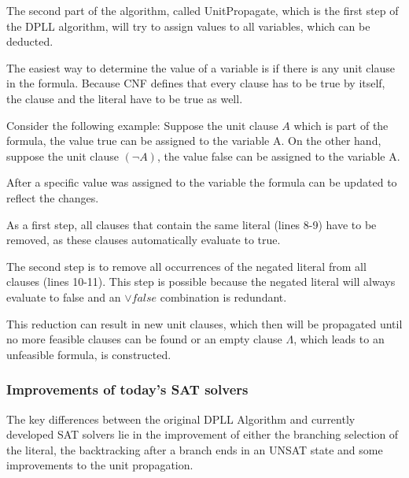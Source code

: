 The second part of the algorithm, called UnitPropagate, which is the first step of the DPLL algorithm, will try to assign values to all variables, which can be deducted.

The easiest way to determine the value of a variable is if there is any unit clause in the formula. Because CNF defines that every clause has to be true by itself, the clause and the literal have to be true as well.

Consider the following example: Suppose the unit clause $A$ which is part of the formula, the value true can be assigned to the variable A. On the other hand, suppose the unit clause $(\lnot A)$, the value false can be assigned to the variable A.

After a specific value was assigned to the variable the formula can be updated to reflect the changes. 

As a first step, all clauses that contain the same literal (lines 8-9) have to be removed, as these clauses automatically evaluate to true. 

The second step is to remove all occurrences of the negated literal from all clauses (lines 10-11). This step is possible because the negated literal will always evaluate to false and an $\lor false$ combination is redundant.

This reduction can result in new unit clauses, which then will be propagated until no more feasible clauses can be found or an empty clause $\Lambda$, which leads to an unfeasible formula, is constructed.



\subsubsection{Improvements of today's SAT solvers}
The key differences between the original DPLL Algorithm and currently developed SAT solvers lie in the improvement of either the branching selection of the literal, the backtracking after a branch ends in an UNSAT state and some improvements to the unit propagation.
